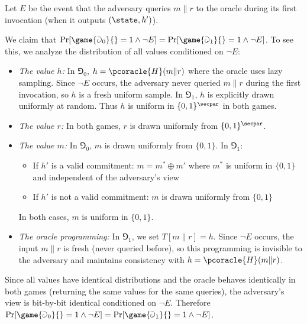 \ifsolutions
\begin{mysolution}
    Let $E$ be the event that the adversary queries $m \| r$ to the oracle during its first invocation (when it outputs $(\state, h')$).
  
  We claim that $\Pr[\game{\Game_0}{} = 1 \wedge \neg E] = \Pr[\game{\Game_1}{} = 1 \wedge \neg E]$. To see this, we analyze the distribution of all values conditioned on $\neg E$:
  
  \begin{itemize}
    \item \emph{The value $h$:} In $\Game_0$, $h = \pcoracle{H}(m \| r)$ where the oracle uses lazy sampling. Since $\neg E$ occurs, the adversary never queried $m \| r$ during the first invocation, so $h$ is a fresh uniform sample. In $\Game_1$, $h$ is explicitly drawn uniformly at random. Thus $h$ is uniform in $\{0,1\}^\secpar$ in both games.
    
    \item \emph{The value $r$:} In both games, $r$ is drawn uniformly from $\{0,1\}^\secpar$.
    
    \item \emph{The value $m$:} In $\Game_0$, $m$ is drawn uniformly from $\{0,1\}$. In $\Game_1$:
      \begin{itemize}
        \item If $h'$ is a valid commitment: $m = m^* \oplus m'$ where $m^*$ is uniform in $\{0,1\}$ and independent of the adversary's view
        \item If $h'$ is not a valid commitment: $m$ is drawn uniformly from $\{0,1\}$
      \end{itemize}
      In both cases, $m$ is uniform in $\{0,1\}$.
    
    \item \emph{The oracle programming:} In $\Game_1$, we set $T[m \| r] = h$. Since $\neg E$ occurs, the input $m \| r$ is fresh (never queried before), so this programming is invisible to the adversary and maintains consistency with $h = \pcoracle{H}(m \| r)$.
  \end{itemize}
  
  Since all values have identical distributions and the oracle behaves identically in both games (returning the same values for the same queries), the adversary's view is bit-by-bit identical conditioned on $\neg E$. Therefore $\Pr[\game{\Game_0}{} = 1 \wedge \neg E] = \Pr[\game{\Game_1}{} = 1 \wedge \neg E]$.
  

\end{mysolution}
